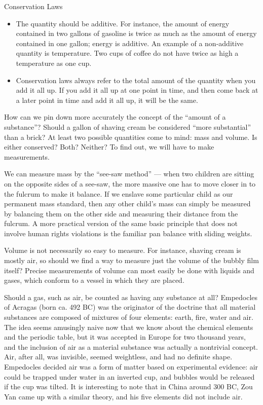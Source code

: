 \begin{lab}{Conservation Laws}
\begin{itemize}
\item[] The quantity should be additive.  For instance, the amount
of energy contained in two gallons of gasoline is twice as
much as the amount of energy contained in one gallon; energy
is additive.  An example of a non-additive quantity is
temperature.  Two cups of coffee do not have twice as high a
temperature as one cup.

\item[] Conservation laws always refer to the total amount of the
quantity when you add it all up.  If you add it all up at
one point in time, and then come back at a later point in
time and add it all up, it will be the same.
\end{itemize}

How can we pin down more accurately the concept of the
``amount of a substance''?  Should a gallon of shaving cream
be considered ``more substantial'' than a brick? At least
two possible quantities come to mind: mass and volume.  Is
either conserved?  Both?  Neither?  To find out, we will
have to make measurements.

We can measure mass by the ``see-saw method'' --- when two
children are sitting on the opposite sides of a see-saw, the
more massive one has to move closer in to the fulcrum to
make it balance.  If we enslave some particular child as our
permanent mass standard, then any other child's mass can
simply be measured by balancing them on the other side and
measuring their distance from the fulcrum.  A more practical
version of the same basic principle that does not involve
human rights violations is the familiar pan balance
with sliding weights.

Volume is not necessarily so easy to measure.  For instance,
shaving cream is mostly air, so should we find a way to
measure just the volume of the bubbly film itself?  Precise
measurements of volume can most easily be done with liquids
and gases, which conform to a vessel in which they are placed.

Should a gas, such as air, be counted as having any
substance at all?  Empedocles of Acragas (born ca. 492 BC)
was the originator of the doctrine that all material
substances are composed of mixtures of four elements: earth,
fire, water and air.  The idea seems amusingly naive now
that we know about the chemical elements and the periodic
table, but it was accepted in Europe for two thousand years,
and the inclusion of air as a material substance was
actually a nontrivial concept.  Air, after all, was
invisible, seemed weightless, and had no definite shape. 
Empedocles decided air was a form of matter based on
experimental evidence: air could be trapped under water in
an inverted cup, and bubbles would be released if the cup
was tilted.  It is interesting to note that in China around
300 BC, Zou Yan came up with a similar theory, and his five
elements did not include air.


\end{lab}
